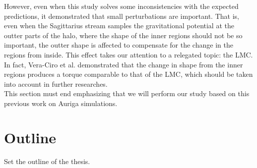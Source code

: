 However, even when this study solves some inconsistencies with the expected predictions, it demonstrated that small perturbations are important. That is, even when the Sagittarius stream samples the gravitational potential at the outter parts of the halo, where the shape of the inner regions should not be so important, the outter shape is affected to compensate for the change in the regions from inside. This effect takes our attention to a relegated topic: the LMC. In fact, Vera-Ciro et al. demonstrated that the change in shape from the inner regions produces a torque comparable to that of the LMC, which should be taken into account in further researches.\\

%

This section must end emphasizing that we will perform our study based on this previous work on Auriga simulations.

\section{Outline}

Set the outline of the thesis.
